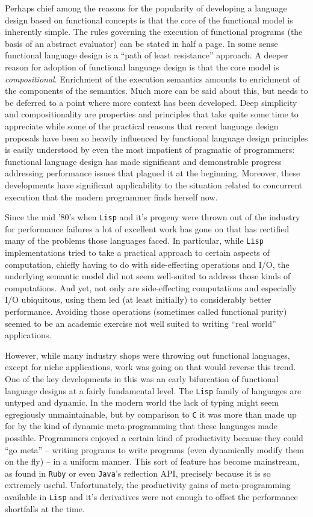 Perhaps chief among the reasons for the popularity of developing a
language design based on functional concepts is that the core of the
functional model is inherently simple. The rules governing the
execution of functional programs (the basis of an abstract evaluator)
can be stated in half a page. In some sense functional language design
is a ``path of least resistance'' approach. A deeper reason for
adoption of functional language design is that the core model is
\emph{compositional}. Enrichment of the execution semantics amounts to
enrichment of the components of the semantics. Much more can be said
about this, but needs to be deferred to a point where more context has
been developed. Deep simplicity and compositionality are properties
and principles that take quite some time to appreciate while some of
the practical reasons that recent language design proposals have been
so heavily influenced by functional language design principles is
easily understood by even the most impatient of pragmatic of
programmers: functional language design has made significant and
demonstrable progress addressing performance issues that plagued it at
the beginning. Moreover, these developments have significant
applicability to the situation related to concurrent execution that
the modern programmer finds herself now.

Since the mid '80's when \texttt{Lisp} and it's progeny were thrown
out of the industry for performance failures a lot of excellent work
has gone on that has rectified many of the problems those languages
faced. In particular, while \texttt{Lisp} implementations tried to
take a practical approach to certain aspects of computation, chiefly
having to do with side-effecting operations and I/O, the underlying
semantic model did not seem well-suited to address those kinds of
computations. And yet, not only are side-effecting computations and
especially I/O ubiquitous, using them led (at least initially) to
considerably better performance. Avoiding those operations (sometimes
called functional purity) seemed to be an academic exercise not well
suited to writing ``real world'' applications.

However, while many industry shops were throwing out functional
languages, except for niche applications, work was going on that would
reverse this trend. One of the key developments in this was an early
bifurcation of functional language designs at a fairly fundamental
level. The \texttt{Lisp} family of languages are untyped and
dynamic. In the modern world the lack of typing might seem egregiously
unmaintainable, but by comparison to \texttt{C} it was more than made
up for by the kind of dynamic meta-programming that these languages
made possible. Programmers enjoyed a certain kind of productivity
because they could ``go meta'' -- writing programs to write programs
(even dynamically modify them on the fly) -- in a uniform manner. This
sort of feature has become mainstream, as found in \texttt{Ruby} or
even \texttt{Java}'s reflection API, precisely because it is so
extremely useful. Unfortunately, the productivity gains of
meta-programming available in \texttt{Lisp} and it's derivatives were
not enough to offset the performance shortfalls at the time.

